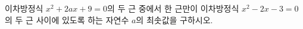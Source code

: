 \hspace*{2mm}\begin{minipage}[t]{\dimexpr\linewidth-2mm\relax}\vspace{0pt}
이차방정식 $x^2+2ax+9=0$의 두 근 중에서 한 근만이 이차방정식 $x^2-2x-3=0$의 두 근 사이에 있도록 하는 자연수 $a$의 최솟값을 구하시오.\end{minipage}
